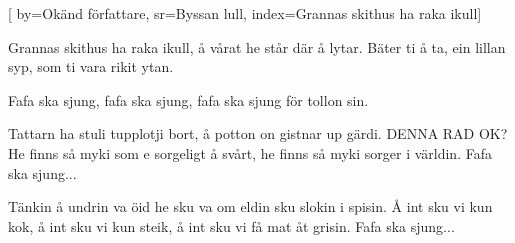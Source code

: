 

[ 		%
	by={Okänd författare},					%
	sr={Byssan lull},					%
	index={Grannas skithus ha raka ikull}]						%
	


\beginverse*						%
Grannas skithus ha raka ikull,
å vårat he står där å lytar.
Bäter ti å ta, ein lillan syp,
som ti vara rikit ytan.
\endverse							%

\beginchorus
Fafa ska sjung,
fafa ska sjung,
fafa ska sjung för tollon sin.
\endchorus


\beginverse*						%
Tattarn ha stuli tupplotji bort,
å potton on gistnar up gärdi. DENNA RAD OK?
He finns så myki som
e sorgeligt å svårt,
he finns så myki sorger i världin.
Fafa ska sjung...
\endverse							%

\beginverse*						%
Tänkin å undrin va öid he sku va
om eldin sku slokin i spisin.
Å int sku vi kun kok,
å int sku vi kun steik,
å int sku vi få mat åt grisin.
Fafa ska sjung...
\endverse							%






\endsong							%